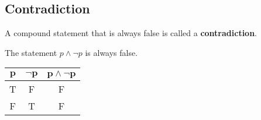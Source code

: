 \documentclass[../notes.tex]{subfiles}
\begin{document}
			\subsection{Contradiction}
				A compound statement that is always false is called a \textbf{contradiction}.
				\begin{example}
					The statement $p \land \lnot p$ is always false.
					\begin{center}
						\begin{tabular}{| c c | c |}
							\hline
							$\mathbf{p}$ & $\mathbf{\lnot p}$ & $\mathbf{p \land \lnot p}$\\
							\hline
							T & F & F\\
							F & T & F\\
							\hline
						\end{tabular}
					\end{center}
				\end{example}
\end{document}
